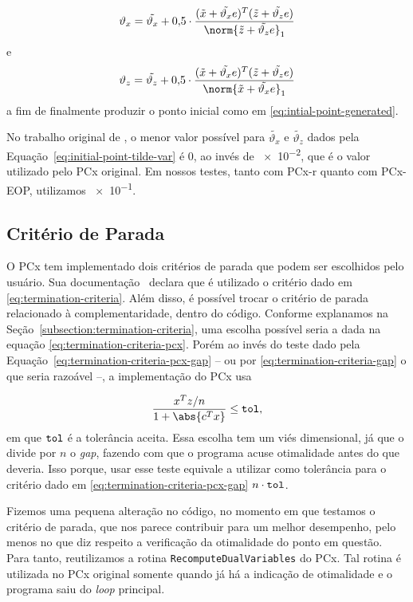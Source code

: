 \begin{equation}
	\label{eq:initial-point-var-x}
\vartheta_{x} = \tilde{\vartheta_x} + \num{0.5}\cdot\dfrac{(\xtil+\tilde{\vartheta_x} e)^{T}(\ztil+\tilde{\vartheta_z} e)}{\norm{\ztil+\tilde{\vartheta_z} e}_{1}} 
\end{equation}
e
\begin{equation}
	\label{eq:initial-point-var-z}
\vartheta_{z} = \tilde{\vartheta_z} + \num{0.5}\cdot\dfrac{(\xtil+\tilde{\vartheta_x} e)^{T}(\ztil+\tilde{\vartheta_z} e)}{\norm{\xtil+\tilde{\vartheta_x} e}_{1}} 
\end{equation}
a fim de finalmente produzir o ponto inicial como em \eqref{eq:intial-point-generated}.

No trabalho original de \textcite{Mehrotra:1992wr}, o menor valor possível para  $\tilde{\vartheta_x}$ e $\tilde{\vartheta_z}$ dados pela Equação~\eqref{eq:initial-point-tilde-var} é $\num{0}$, ao invés de \num{e-2}, 	que é o valor utilizado pelo PCx original. Em nossos testes, tanto com PCx-r quanto com PCx-EOP, utilizamos \num{e-1}. 


\subsection{Critério de Parada}


O PCx tem implementado dois critérios de parada que podem ser escolhidos pelo usuário. Sua   documentação~\cite{Czyzyk:1998vw} declara que é utilizado o critério dado em \eqref{eq:termination-criteria}.   Além disso, é possível trocar o critério de parada relacionado à complementaridade, dentro do código. Conforme explanamos na Seção~\ref{subsection:termination-criteria}, uma escolha possível seria a dada na equação \eqref{eq:termination-criteria-pcx}. Porém ao invés do teste dado pela Equação~\eqref{eq:termination-criteria-pcx-gap} -- ou por \eqref{eq:termination-criteria-gap} o que seria razoável --, a implementação do PCx usa

\[
\dfrac{x^{T}z/n}{1 + \abs{c^Tx}}\leq
	\tol,
\]
em que $\mathtt{tol}$ é a tolerância aceita. Essa escolha tem um viés dimensional, já que o divide por $n$ o \emph{gap}, fazendo com que o programa acuse otimalidade  antes do que deveria. Isso porque, usar esse teste equivale a utilizar como tolerância para o critério dado em \eqref{eq:termination-criteria-pcx-gap} $n\cdot\mathtt{tol}$. 


Fizemos uma pequena alteração no código, no momento em que testamos o critério de parada, que nos parece  contribuir para um melhor desempenho, pelo menos  no que diz respeito a verificação da otimalidade do ponto em questão. Para tanto, reutilizamos a rotina \verb|RecomputeDualVariables| do PCx. Tal rotina  é utilizada no PCx original somente quando já há a indicação de otimalidade e o programa saiu do \emph{loop} principal.

